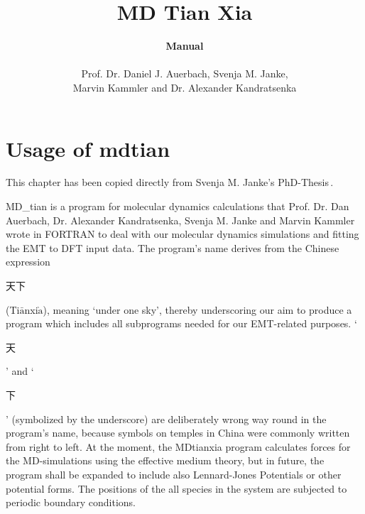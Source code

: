 \documentclass[twoside, 11pt, titlepage, captions=nooneline, a4paper, headsepline]{scrbook}%
\title{\huge{MD Tian Xia}}
\author{\textbf{Manual}\\ \\Prof. Dr. Daniel J. Auerbach, Svenja M. Janke,\\Marvin Kammler and Dr. Alexander Kandratsenka}
\date{}
\newcommand{\9}{\mathrm}
\newcommand{\0}{\,\mathrm}
\begin{document}
\frontmatter

\maketitle
\thispagestyle{empty}
\newpage
\tableofcontents
\newpage


\mainmatter

\chapter{Usage of mdtian}
\label{Sec:usage:MDtian}
This chapter has been copied directly from Svenja M. Janke's PhD-Thesis\,\cite{svenjaphd}.

MD\_tian is a program for molecular dynamics calculations that Prof. Dr. Dan Auerbach, Dr. Alexander Kandratsenka, Svenja M. Janke and Marvin Kammler wrote in FORTRAN to deal with our molecular dynamics simulations and fitting the EMT to DFT input data. The program's name derives from the Chinese expression
\begin{CJK*}{UTF8}{gbsn}
天下
\end{CJK*}
(Ti$\bar{\mathrm{a}}$nxi$\grave{\mathrm{a}}$), meaning `under one sky', thereby underscoring our aim to produce a program which includes all subprograms needed for our EMT-related purposes. `\begin{CJK*}{UTF8}{gbsn}
天
\end{CJK*}' and `\begin{CJK*}{UTF8}{gbsn}
下
\end{CJK*}' (symbolized by the underscore) are deliberately wrong way round in the program's name, because symbols on temples in China were commonly written from right to left.
At the moment, the MDtianxia program calculates forces for the MD-simulations using the effective medium theory, but in future, the program shall be expanded to include also Lennard-Jones Potentials or other potential forms. 
The positions of the all species in the system are subjected to periodic boundary conditions.
\end{document}
